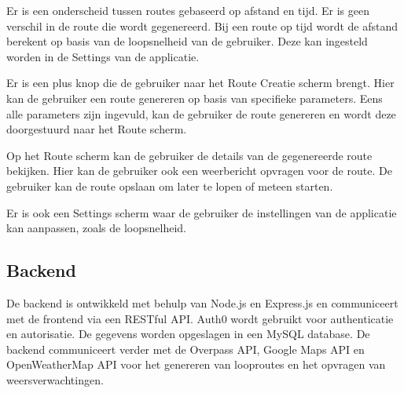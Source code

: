     Er is een onderscheid tussen routes gebaseerd op afstand en tijd. Er is geen verschil in de route die wordt gegenereerd. Bij een route op tijd wordt de afstand berekent op basis van de loopsnelheid van de gebruiker. Deze kan ingesteld worden in de Settings van de applicatie.


    Er is een plus knop die de gebruiker naar het Route Creatie scherm brengt. Hier kan de gebruiker een route genereren op basis van specifieke parameters. Eens alle parameters zijn ingevuld, kan de gebruiker de route genereren en wordt deze doorgestuurd naar het Route scherm.


    Op het Route scherm kan de gebruiker de details van de gegenereerde route bekijken. Hier kan de gebruiker ook een weerbericht opvragen voor de route. De gebruiker kan de route opslaan om later te lopen of meteen starten.


    Er is ook een Settings scherm waar de gebruiker de instellingen van de applicatie kan aanpassen, zoals de loopsnelheid.

    \subsection{Backend}
    
    De backend is ontwikkeld met behulp van Node.js en Express.js en communiceert met de frontend via een RESTful API. 
    Auth0 wordt gebruikt voor authenticatie en autorisatie. De gegevens worden opgeslagen in een MySQL database. 
    De backend communiceert verder met de Overpass API, Google Maps API en OpenWeatherMap API voor het genereren van looproutes en het opvragen van weersverwachtingen.
    
